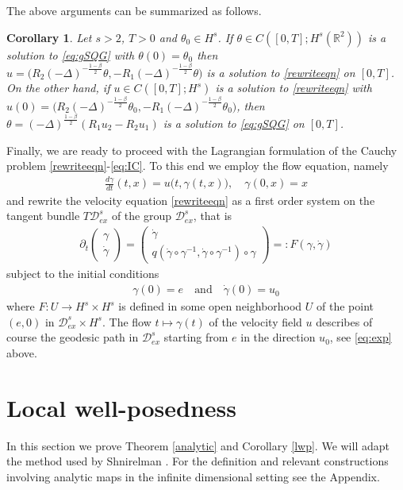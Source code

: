 \documentclass[11pt]{amsart}
\newtheorem{corollary}[theorem]{Corollary}
\numberwithin{equation}{section}
\begin{document}
The above arguments can be summarized as follows.
	\begin{corollary}\label{prop_equivalence}
	Let $s > 2$, $T > 0$ and $\theta_0 \in H^s$. If $\theta \in C([0,T];H^s(\mathbb R^2))$ is a solution to \eqref{eq:gSQG} with $\theta(0)=\theta_0$ then $u=\big(R_2(-\Delta)^{-\frac{1-\beta}{2}}\theta,-R_1(-\Delta)^{-\frac{1-\beta}{2}}\theta\big)$ is a solution to \eqref{rewriteeqn} on $[0,T]$. On the other hand, if $u \in C([0,T];H^s)$ is a solution to \eqref{rewriteeqn} with $u(0)=\big(R_2(-\Delta)^{-\frac{1-\beta}{2}}\theta_{0},-R_1(-\Delta)^{-\frac{1-\beta}{2}}\theta_{0}\big)$, then $\theta=(-\Delta)^{\frac{1-\beta}{2}}(R_1 u_2-R_2 u_1)$ is a solution to \eqref{eq:gSQG} on $[0,T]$.
\end{corollary}	

Finally, we are ready to proceed with the Lagrangian formulation of the Cauchy problem \eqref{rewriteeqn}-\eqref{eq:IC}. To this end we employ the flow equation, namely
%
\begin{align} \label{eq:flow-eq} 
	\frac{d \gamma}{dt}(t,x) = u\big(t, \gamma(t,x)\big),\quad \gamma(0,x)=x
\end{align}
% 
and rewrite the velocity equation \eqref{rewriteeqn} as a first order system on the tangent bundle $ T\mathcal{D}_{ex}^s$ of the group $\mathcal{D}_{ex}^s$, that is
\begin{align}\label{lagrange}
	\partial_t\left(\begin{matrix}
		\gamma\\
		\dot{\gamma}
	\end{matrix}\right)=\left(\begin{matrix}
		\dot{\gamma}\\
		q(\dot{\gamma}\circ \gamma^{-1},\dot{\gamma}\circ\gamma^{-1} )\circ \gamma
	\end{matrix}\right)=:F(\gamma, \dot{\gamma})
\end{align}
subject to the initial conditions
\begin{align}\label{eq:intial_lagr}
	\gamma(0)=e \quad \text{and} \quad 	\dot{\gamma}(0)= u_0
\end{align}
where $F:U \rightarrow H^s\times H^s$ is defined in some open neighborhood $U$ of the point $(e,0)$ in $ \mathcal{D}_{ex}^s\times H^s$. The flow $t\mapsto \gamma(t)$ of the velocity field $u$ describes of course the geodesic path in $\mathcal{D}_{ex}^s$ starting from $e$ in the direction $u_0$, see \eqref{eq:exp} above.

	\section{Local well-posedness}\label{section_lwp}
In this section we prove Theorem \ref{analytic} and Corollary \ref{lwp}. We will adapt the method used by Shnirelman \cite{Shn12}.  
%
For the definition and relevant constructions involving analytic maps in the infinite dimensional setting see the Appendix. 	
\end{document}
